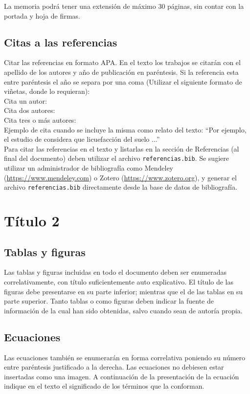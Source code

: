 \documentclass[11pt,letterpaper]{article}
\begin{document}
La memoria podrá tener una extensión de máximo 30 páginas, sin contar con la portada y hoja de firmas.

\subsection{Citas a las referencias}
Citar las referencias en formato APA. En el texto los trabajos se citarán con el apellido de los autores y año de publicación en paréntesis. Si la referencia esta entre paréntesis el año se separa por una coma (Utilizar el siguiente formato de viñetas, donde lo requieran):\\

Cita un autor: \parencite{fredlund2006unsaturated}\\

Cita dos autores: \parencite{kramer2017effects}\\

Cita tres o más autores: \parencite{terzaghi1996soil}\\

Ejemplo de cita cuando se incluye la misma como relato del texto: ``Por ejemplo, el estudio de \textcite{yoshimi1989liquefaction} considera que licuefacción del suelo ...'' \\

Para citar las referencias en el texto y listarlas en la sección de Referencias (al final del documento) deben utilizar el archivo \texttt{referencias.bib}. Se sugiere utilizar un administrador de bibliografía como Mendeley (\url{https://www.mendeley.com}) o Zotero (\url{https://www.zotero.org}), y generar el archivo \texttt{referencias.bib} directamente desde la base de datos de bibliografía. 

\section{Título 2}
\subsection{Tablas y figuras}
Las tablas y figuras incluidas en todo el documento deben ser enumeradas correlativamente, con título suficientemente auto explicativo. El título de las figuras debe presentarse en su parte inferior; mientras que el de las tablas en su parte superior. Tanto tablas o como figuras deben indicar la fuente de información de la cual han sido obtenidas, salvo cuando sean de autoría propia.

\subsection{Ecuaciones}
Las ecuaciones también se enumerarán en forma correlativa poniendo su número entre paréntesis justificado a la derecha. Las ecuaciones no debiesen estar insertadas como una imagen.  A continuación de la presentación de la ecuación indique en el texto el significado de los términos que la conforman.
\end{document}
